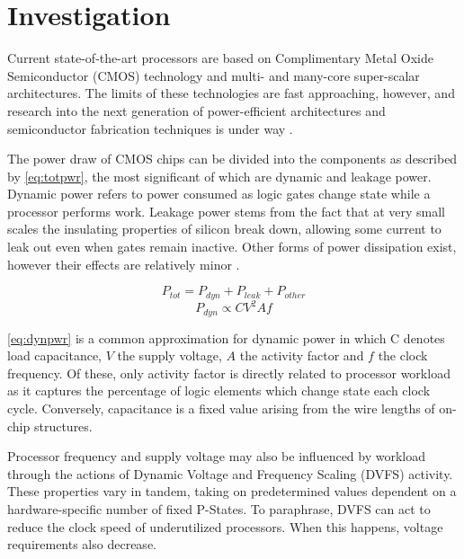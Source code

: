 \section{Investigation}


Current state-of-the-art processors are based on Complimentary Metal Oxide Semiconductor (CMOS) technology and multi- and many-core super-scalar architectures. The limits of these technologies are fast  approaching, however, and research into the next generation of power-efficient architectures and semiconductor fabrication techniques is under way \cite{esmaeilzadeh:2011aa}.

The power draw of CMOS chips can be divided into the components as described by \autoref{eq:totpwr}, the most significant of which are dynamic and leakage power. Dynamic power refers to power consumed as logic gates change state while a processor performs work. Leakage power stems from the fact that at very small scales the insulating properties of silicon break down, allowing some current to leak out even when gates remain inactive. Other forms of power dissipation exist, however their effects are relatively minor \cite{kaxiras:2008aa}.


\begin{equation}
\label{eq:totpwr}
P_{tot} = P_{dyn} + P_{leak} + P_{other}
\end{equation}
\begin{equation} 
\label{eq:dynpwr}
P_{dyn} \propto CV^{2}Af
\end{equation}

\autoref{eq:dynpwr} is a common approximation for dynamic power in which C denotes load capacitance, $V$ the supply voltage, $A$ the activity factor and $f$ the clock frequency. Of these, only activity factor is directly related to processor workload as it captures the percentage of logic elements which change state each clock cycle. Conversely, capacitance is a fixed value arising from the wire lengths of on-chip structures.

Processor frequency and supply voltage may also be influenced by workload through the actions of Dynamic Voltage and Frequency Scaling (DVFS) activity. These properties vary in tandem, taking on predetermined values dependent on a hardware-specific number of fixed P-States. To paraphrase, DVFS can act to reduce the clock speed of underutilized processors. When this happens, voltage requirements also decrease.

